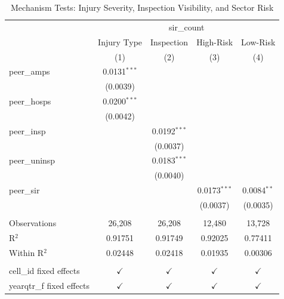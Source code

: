
\begin{table}[htbp]
   \caption{\label{tab:mechanisms} Mechanism Tests: Injury Severity, Inspection Visibility, and Sector Risk}
   \bigskip
   \centering
   \begin{tabular}{lcccc}
      \toprule
       & \multicolumn{4}{c}{sir\_count}\\
                                & Injury Type    & Inspection     & High-Risk      & Low-Risk \\   
                                & (1)            & (2)            & (3)            & (4)\\  
      \midrule 
      peer\_amps                & 0.0131$^{***}$ &                &                &   \\   
                                & (0.0039)       &                &                &   \\   
      peer\_hosps               & 0.0200$^{***}$ &                &                &   \\   
                                & (0.0042)       &                &                &   \\   
      peer\_insp                &                & 0.0192$^{***}$ &                &   \\   
                                &                & (0.0037)       &                &   \\   
      peer\_uninsp              &                & 0.0183$^{***}$ &                &   \\   
                                &                & (0.0040)       &                &   \\   
      peer\_sir                 &                &                & 0.0173$^{***}$ & 0.0084$^{**}$\\   
                                &                &                & (0.0037)       & (0.0035)\\   
       \\
      Observations              & 26,208         & 26,208         & 12,480         & 13,728\\  
      R$^2$                     & 0.91751        & 0.91749        & 0.92025        & 0.77411\\  
      Within R$^2$              & 0.02448        & 0.02418        & 0.01935        & 0.00306\\  
       \\
      cell\_id fixed effects    & $\checkmark$   & $\checkmark$   & $\checkmark$   & $\checkmark$\\   
      yearqtr\_f fixed effects  & $\checkmark$   & $\checkmark$   & $\checkmark$   & $\checkmark$\\   
      \bottomrule
   \end{tabular}
   

\end{table}
